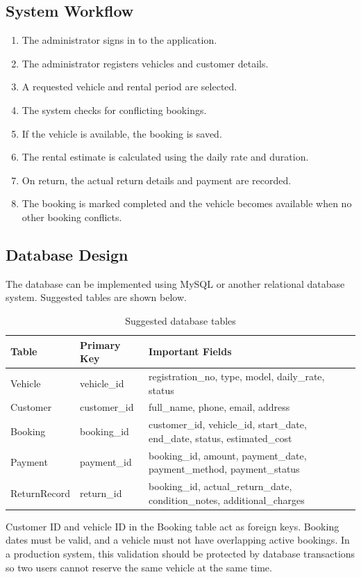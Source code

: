 \documentclass[11pt,a4paper]{report}
\begin{document}
\subsection{System Workflow}
\begin{enumerate}
\item The administrator signs in to the application.
\item The administrator registers vehicles and customer details.
\item A requested vehicle and rental period are selected.
\item The system checks for conflicting bookings.
\item If the vehicle is available, the booking is saved.
\item The rental estimate is calculated using the daily rate and duration.
\item On return, the actual return details and payment are recorded.
\item The booking is marked completed and the vehicle becomes available when no other booking conflicts.
\end{enumerate}

\subsection{Database Design}
The database can be implemented using MySQL or another relational database system. Suggested tables are shown below.

\begin{longtable}{|p{3cm}|p{3.4cm}|p{7cm}|}
\caption{Suggested database tables}\\
\hline
\textbf{Table} & \textbf{Primary Key} & \textbf{Important Fields}\\ \hline
Vehicle & vehicle\_id & registration\_no, type, model, daily\_rate, status\\ \hline
Customer & customer\_id & full\_name, phone, email, address\\ \hline
Booking & booking\_id & customer\_id, vehicle\_id, start\_date, end\_date, status, estimated\_cost\\ \hline
Payment & payment\_id & booking\_id, amount, payment\_date, payment\_method, payment\_status\\ \hline
ReturnRecord & return\_id & booking\_id, actual\_return\_date, condition\_notes, additional\_charges\\ \hline
\end{longtable}

Customer ID and vehicle ID in the Booking table act as foreign keys. Booking dates must be valid, and a vehicle must not have overlapping active bookings. In a production system, this validation should be protected by database transactions so two users cannot reserve the same vehicle at the same time.
\end{document}

